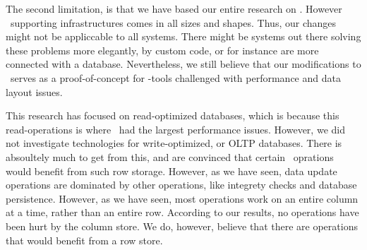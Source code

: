 The second limitation, is that we have based our entire research on \gap. However \mde~supporting infrastructures comes in all sizes and shapes. Thus, our changes might not be appliccable to all systems. There might be systems out there solving these problems more elegantly, by custom code, or for instance are more connected with a database. Nevertheless, we still believe that our modifications to \gap~serves as a proof-of-concept for \mde-tools challenged with performance and data layout issues.

This research has focused on read-optimized databases, which is because this read-operations is where \gap~had the largest performance issues. However, we did not investigate technologies for write-optimized, or OLTP databases. There is absoultely much to get from this, and are convinced that certain \gap~oprations would benefit from such row storage. However, as we have seen, data update operations are dominated by other operations, like integrety checks and database persistence. However, as we have seen, most operations work on an entire column at a time, rather than an entire row. According to our results, no operations have been hurt by the column store. We do, however, believe that there are operations that would benefit from a row store.

